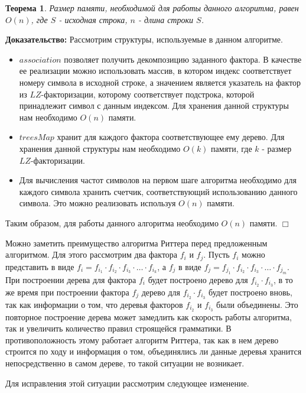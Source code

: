 \documentclass[12pt,a4paper]{extarticle}
\theoremstyle{break}
\newtheorem{theorem}{Теорема}
\begin{document}
\begin{theorem}
Размер памяти, необходимой для работы данного алгоритма,
равен $O(n)$, где $S$ - исходная строка, $n$ - длина строки $S$.
\end{theorem} 

\textbf{Доказательство:} Рассмотрим структуры, используемые в данном алгоритме.

\begin{itemize}
  \item $association$ позволяет получить  декомпозицию заданного фактора. В качестве ее
реализации можно использовать массив, в котором индекс соответствует номеру
символа в исходной строке, а значением является указатель на фактор из
$LZ$-факторизации, которому соответствует подстрока, которой принадлежит символ
с данным индексом. Для хранения данной структуры нам необходимо $O(n)$ памяти.
\item $treesMap$ хранит для каждого фактора соответствующее ему дерево. Для хранения
данной структуры нам необходимо $O(k)$ памяти, где $k$ - размер
$LZ$-факторизации.
\item Для вычисления частот символов на первом шаге алгоритма необходимо для каждого
символа хранить счетчик, соответствующий использованию данного символа. Это
можно реализовать используя $O(n)$ памяти.
\end{itemize}

Таким образом, для работы данного алгоритма необходимо $O(n)$ памяти.
$\Box$

Можно заметить преимущество алгоритма Риттера перед предложенным алгоритмом.
Для этого рассмотрим два фактора $f_i$ и $f_j$. Пусть $f_i$ можно представить в
виде $f_i = f_{i_1} \cdot f_{i_2} \cdot f_{i_3} \cdot \ldots
\cdot f_{i_k}$, а $f_j$ в виде $f_j = f_{j_1} \cdot f_{i_2} \cdot f_{i_3} \cdot
\ldots \cdot f_{j_m}$. При построении дерева для фактора $f_i$ будет построено
дерево для $f_{i_2} \cdot f_{i_3}$, в то же время при построении фактора $f_j$
дерево для $f_{i_2} \cdot f_{i_3}$ будет построено вновь, так как информации о
том, что деревья факторов $f_{i_2}$ и $f_{i_3}$ были объединены. Это повторное
построение дерева может замедлить как скорость работы алгоритма, так и увеличить
количество правил строящейся грамматики. В противоположность этому работает алгоритм Риттера, так как в нем дерево
строится по ходу и информация о том, объединялись ли данные деревья хранится
непосредственно в самом дереве, то такой ситуации не возникает.

Для исправления этой ситуации рассмотрим следующее изменение.
\end{document}

